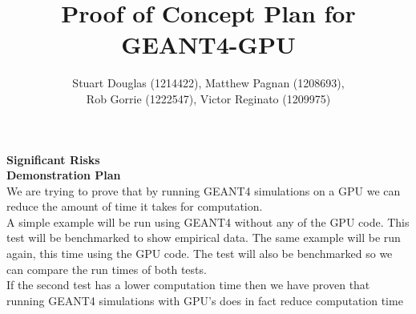 \documentclass[12pt]{article}
\begin{document}
\title{\vspace{-4em}Proof of Concept Plan for GEANT4-GPU} \author{Stuart Douglas
(1214422), Matthew Pagnan (1208693), \\ Rob Gorrie (1222547), Victor Reginato
(1209975)}
	
\maketitle


\noindent \textbf{Significant Risks}\\

\noindent \textbf{Demonstration Plan}\\
\noindent
We are trying to prove that by running GEANT4 simulations on a GPU we can reduce the amount of time it takes for computation.\\

\noindent
A simple example will be run using GEANT4 without any of the GPU code. This test will be benchmarked to show empirical data. The same example will be run again, this time using the GPU code. The test will also be benchmarked so we can compare the run times of both tests.\\

\noindent
If the second test has a lower computation time then we have proven that running GEANT4 simulations with GPU's does in fact reduce computation time

 
\end{document}
